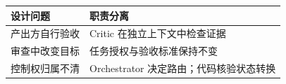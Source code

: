 \begin{tabular}{@{}P{4.2cm}P{8.3cm}@{}}
\toprule
\textbf{设计问题} & \textbf{职责分离} \\
\midrule
产出方自行验收 & Critic 在独立上下文中检查证据 \\
审查中改变目标 & 任务授权与验收标准保持不变 \\
控制权归属不清 & Orchestrator 决定路由；代码核验状态转换 \\
\bottomrule
\end{tabular}
